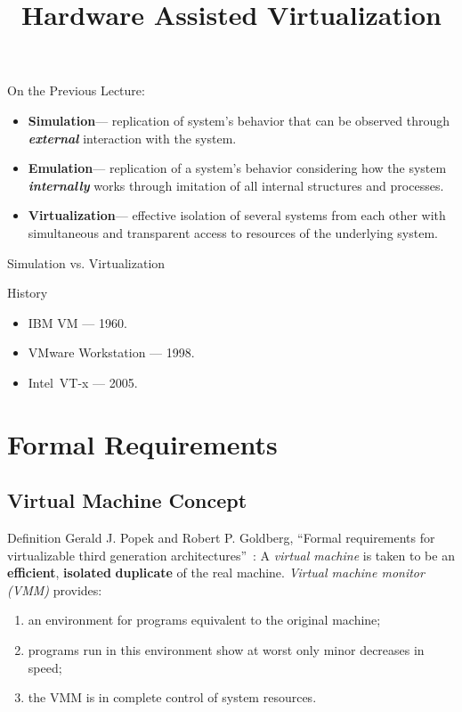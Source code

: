 
\title{Hardware Assisted Virtualization}



\startslides

\begin{frame}{On the Previous Lecture:}
\begin{itemize}
\item \textbf{Simulation}\pause --- replication of system's behavior that can
  be observed through \textbf{\textit{external}} interaction with the system.
\item \textbf{Emulation}\pause --- replication of a system's behavior
  considering how the system \textbf{\textit{internally}} works through
  imitation of all internal structures and processes.
\item \textbf{Virtualization}\pause --- effective isolation of several systems
  from each other with simultaneous and transparent access to resources of the
  underlying system.
\end{itemize}
\end{frame}

\begin{frame}{Simulation vs. Virtualization}
\centering
{}
\vfill
{}
\end{frame}

\begin{frame}{History}
\begin{itemize}
\item IBM VM --- 1960.
\item VMware Workstation --- 1998.
\item Intel\reg~VT-x --- 2005.
\end{itemize}
\end{frame}

\section{Formal Requirements}

\subsection{Virtual Machine Concept}

\begin{frame}{Definition}
Gerald J. Popek and Robert P. Goldberg, ``Formal requirements for
virtualizable third generation architectures''~\cite{goldberg}:
\vfill\pause
A \textit{virtual machine} is taken to be an \textbf{efficient},
\textbf{isolated} \textbf{duplicate} of the real machine.
\vfill\pause
\textit{Virtual machine monitor (VMM)} provides:
\begin{enumerate}
\item an environment for programs equivalent to the original machine;\pause
\item programs run in this environment show at worst only minor decreases in
  speed;\pause
\item the VMM is in complete control of system resources.
\end{enumerate}
\end{frame}


